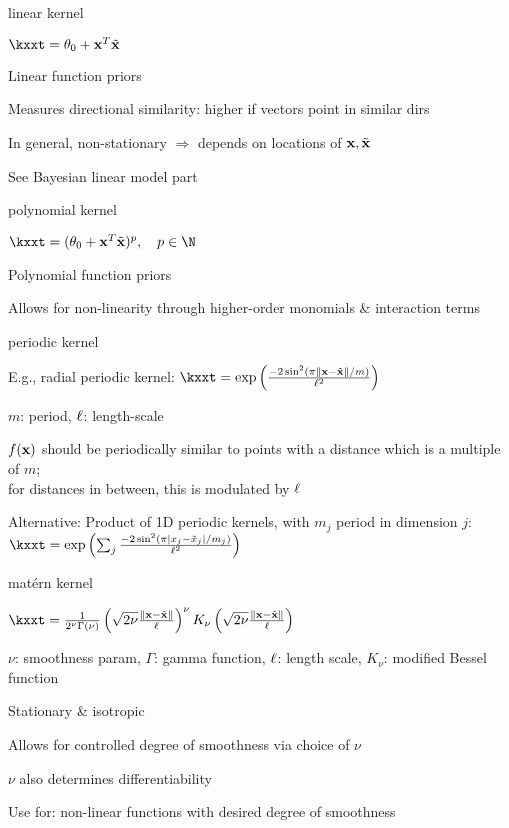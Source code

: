 \documentclass[11pt,compress,t,notes=noshow, xcolor=table]{beamer}
\begin{document}
\begin{framei}{linear kernel}
\item $\kxxt = \theta_0 + \xv^T \xtil$
\item Linear function priors
\item Measures directional similarity: higher if vectors point in similar dirs
\item In general, non-stationary $\Rightarrow$ depends on locations of $\mathbf{x}, \tilde{\mathbf{x}}$
\item See Bayesian linear model part
\vfill
{}
\end{framei}

\begin{framei}{polynomial kernel}
\item $\kxxt = (\theta_0 + \xv^T \xtil )^p, \quad p \in \N$
\item Polynomial function priors
\item Allows for non-linearity through higher-order monomials \& interaction terms
\vfill
{}
\end{framei}

\begin{framei}{periodic kernel}
\item E.g., radial periodic kernel: $\kxxt = \exp \left(\frac{-2\sin^2 (\pi \xxtnorm / m)}{\ls^2} \right)$
\item $m$: period, $\ell$: length-scale
\item $f(\mathbf{x})$ should be periodically similar to points with a distance which is a multiple of $m$;\\
for distances in between, this is modulated by $\ell$
\item Alternative: Product of 1D periodic kernels, with $m_j$ period in dimension $j$: $\kxxt =  \exp \left(\sum_j\frac{-2\sin^2 (\pi |x_j - \tilde{x}_j| / m_j)}{\ls^2} \right)$
\vfill
{}
\end{framei}

\begin{framei}{matérn kernel}
\item $\kxxt = \frac{1}{2^\nu \Gamma(\nu)} \left( \sqrt{2 \nu} \frac{\xxtnorm}{\ls} \right)^\nu K_\nu \left( \sqrt{2 \nu} \frac{\xxtnorm}{\ls} \right)$
\item $\nu$: smoothness param, $\Gamma$: gamma function, $\ell$: length scale, $K_\nu$: modified Bessel function
\item Stationary \& isotropic
\item Allows for controlled degree of smoothness via choice of $\nu$
\item $\nu$ also determines differentiability
\item Use for: non-linear functions with desired degree of smoothness
\vfill
{}
\end{framei}
\end{document}
